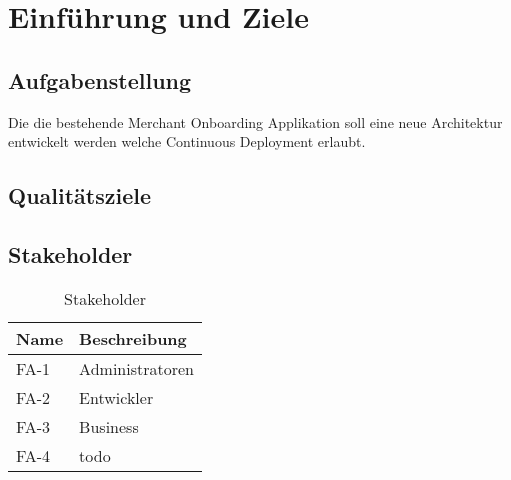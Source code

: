 \chapter{Einführung und Ziele}



\section{Aufgabenstellung}

Die die bestehende Merchant Onboarding Applikation soll eine neue Architektur entwickelt werden welche Continuous Deployment erlaubt.

\section{Qualitätsziele}

\section{Stakeholder}

\begin{table}[H]
	\centering
	\caption{Stakeholder}
	\begin{tabular}{ | p{2cm} | p{14cm} | }
		\toprule
		{\textbf{Name}} & {\textbf{Beschreibung}} \\
		\midrule
		FA-1 & Administratoren \\ \hline
		FA-2 & Entwickler \\ \hline
		FA-3 & Business \\ \hline
		FA-4 & todo \\
		\bottomrule
	\end{tabular}
\end{table}